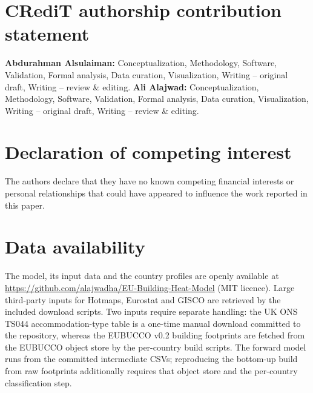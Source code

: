 \documentclass[review]{elsarticle}
\begin{document}





\section*{CRediT authorship contribution statement}
\textbf{Abdurahman Alsulaiman:} Conceptualization, Methodology, Software, Validation, Formal analysis, Data curation, Visualization, Writing -- original draft, Writing -- review \& editing. \textbf{Ali Alajwad:} Conceptualization, Methodology, Software, Validation, Formal analysis, Data curation, Visualization, Writing -- original draft, Writing -- review \& editing.

\section*{Declaration of competing interest}
The authors declare that they have no known competing financial interests or personal relationships that could have appeared to influence the work reported in this paper.

%

\section*{Data availability}
The model, its input data and the country profiles are openly available at \url{https://github.com/alajwadha/EU-Building-Heat-Model} (MIT licence). Large third-party inputs for Hotmaps, Eurostat and GISCO are retrieved by the included download scripts. Two inputs require separate handling: the UK ONS TS044 accommodation-type table is a one-time manual download committed to the repository, whereas the EUBUCCO v0.2 building footprints are fetched from the EUBUCCO object store by the per-country build scripts. The forward model runs from the committed intermediate CSVs; reproducing the bottom-up build from raw footprints additionally requires that object store and the per-country classification step.
\end{document}
